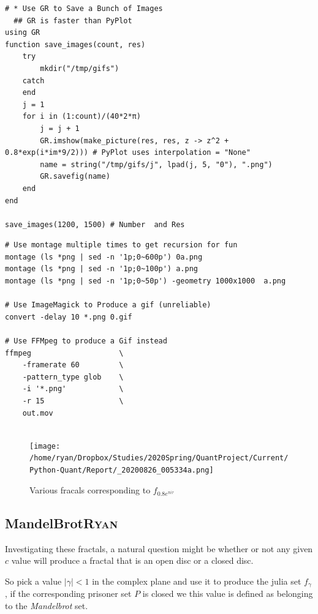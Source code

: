 \documentclass[11pt]{article}
\begin{document}
\begin{lstlisting}
# * Use GR to Save a Bunch of Images
  ## GR is faster than PyPlot
using GR
function save_images(count, res)
    try
        mkdir("/tmp/gifs")
    catch
    end
    j = 1
    for i in (1:count)/(40*2*π)
        j = j + 1
        GR.imshow(make_picture(res, res, z -> z^2 + 0.8*exp(i*im*9/2))) # PyPlot uses interpolation = "None"
        name = string("/tmp/gifs/j", lpad(j, 5, "0"), ".png")
        GR.savefig(name)
    end
end

save_images(1200, 1500) # Number  and Res
\end{lstlisting}

\begin{lstlisting}
# Use montage multiple times to get recursion for fun
montage (ls *png | sed -n '1p;0~600p') 0a.png
montage (ls *png | sed -n '1p;0~100p') a.png
montage (ls *png | sed -n '1p;0~50p') -geometry 1000x1000  a.png

# Use ImageMagick to Produce a gif (unreliable)
convert -delay 10 *.png 0.gif

# Use FFMpeg to produce a Gif instead
ffmpeg                    \
    -framerate 60         \
    -pattern_type glob    \
    -i '*.png'            \
    -r 15                 \
    out.mov


\end{lstlisting}

\begin{figure}[htbp]
\centering
\texttt{[image: /home/ryan/Dropbox/Studies/2020Spring/QuantProject/Current/Python-Quant/Report/\_20200826\_005334a.png]}
\caption{\label{montage-frac}Various fracals corresponding to \(f_{0.8 e^{\pi i \tau}}\)}
\end{figure}

\subsection{MandelBrot\hfill{}\textsc{Ryan}}
\label{sec:org83f421b}
Investigating these fractals, a natural question might be whether or not any
given \(c\) value will produce a fractal that is an open disc or a closed disc.

So pick a value \(\left\lvert \gamma \right \rvert < 1\) in the complex plane and
use it to produce the julia set \(f_{\gamma}\), if the corresponding prisoner set
\(P\) is closed we this value is defined as belonging to the \emph{Mandelbrot} set.
\end{document}
